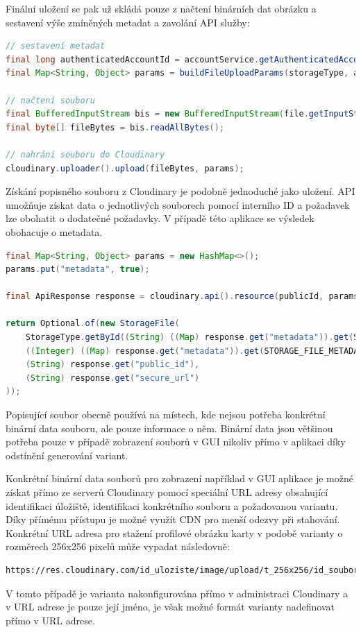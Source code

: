 \begin{itemize}
\begin{itemize}
		Finální uložení se pak už skládá pouze z načtení binárních dat obrázku a sestavení výše zmíněných metadat a zavolání \ac{API}
		služby:
		\begin{lstlisting}[language=Java]
// sestavení metadat
final long authenticatedAccountId = accountService.getAuthenticatedAccount().getId();
final Map<String, Object> params = buildFileUploadParams(storageType, authenticatedAccountId);

// načtení souboru
final BufferedInputStream bis = new BufferedInputStream(file.getInputStream());
final byte[] fileBytes = bis.readAllBytes();

// nahrání souboru do Cloudinary
cloudinary.uploader().upload(fileBytes, params);
		\end{lstlisting}

		Získání popisného souboru z Cloudinary je podobně jednoduché jako uložení.
		\ac{API} umožňuje získat data o jednotlivých souborech pomocí interního ID a požadavek lze obohatit o dodatečné požadavky.
		V případě této aplikace se výsledek obohacuje o metadata.
		\begin{lstlisting}[language=Java]
final Map<String, Object> params = new HashMap<>();
params.put("metadata", true);

final ApiResponse response = cloudinary.api().resource(publicId, params);

return Optional.of(new StorageFile(
	StorageType.getById((String) ((Map) response.get("metadata")).get(STORAGE_FILE_METADATA_STORAGE_TYPE_NAME)),
	((Integer) ((Map) response.get("metadata")).get(STORAGE_FILE_METADATA_OWNER_ID_NAME)).longValue(),
	(String) response.get("public_id"),
	(String) response.get("secure_url")
));
		\end{lstlisting}
		Popisující soubor obecně používá na místech, kde nejsou potřeba konkrétní binární data souboru, ale pouze
		informace o něm.
		Binární data jsou většinou potřeba pouze v případě zobrazení souborů v \ac{GUI} nikoliv přímo v aplikaci díky
		odstínění generování variant.

		Konkrétní binární data souborů pro zobrazení například v \ac{GUI} aplikace je možné získat přímo ze serverů
		Cloudinary pomocí speciální \ac{URL} adresy obsahující identifikaci úložiště, identifikaci konkrétního souboru a
		požadovanou variantu.
		Díky přímému přístupu je možné využít \ac{CDN} pro menší odezvy při stahování.
		Konkrétní \ac{URL} adresa pro stažení profilové obrázku karty v podobě varianty o rozměrech 256x256 pixelů může
		vypadat následovně:
		\begin{lstlisting}
https://res.cloudinary.com/id_uloziste/image/upload/t_256x256/id_souboru
		\end{lstlisting}
		V tomto případě je varianta nakonfigurována přímo v administraci Cloudinary a v \ac{URL} adrese je pouze její jméno,
		je však možné formát varianty nadefinovat přímo v \ac{URL} adrese.


\end{itemize}
\end{itemize}
